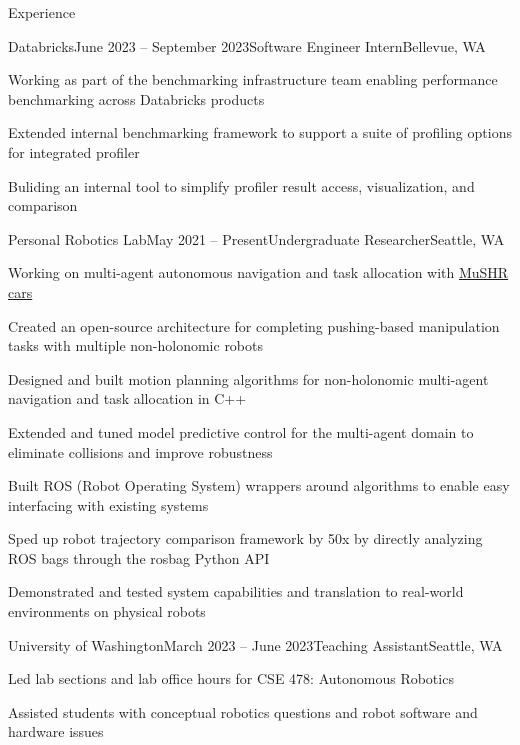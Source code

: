 \documentclass{resume} %
\begin{document}
\begin{rSection}{Experience}

\begin{rSubsection}{Databricks}{June 2023 – September 2023}{Software Engineer Intern}{Bellevue, WA}
\item Working as part of the benchmarking infrastructure team enabling performance benchmarking across Databricks products
\item Extended internal benchmarking framework to support a suite of profiling options for integrated profiler
\item Buliding an internal tool to simplify profiler result access, visualization, and comparison
\end{rSubsection}

\begin{rSubsection}{Personal Robotics Lab}{May 2021 – Present}{Undergraduate Researcher}{Seattle, WA}
\item Working on multi-agent autonomous navigation and task allocation with \href{https://mushr.io}{MuSHR cars}
\item Created an open-source architecture for completing pushing-based manipulation tasks with multiple non-holonomic robots
\item Designed and built motion planning algorithms for non-holonomic multi-agent navigation and task allocation in C++
\item Extended and tuned model predictive control for the multi-agent domain to eliminate collisions and improve robustness
\item Built ROS (Robot Operating System) wrappers around algorithms to enable easy interfacing with existing systems
\item Sped up robot trajectory comparison framework by 50x by directly analyzing ROS bags through the rosbag Python API
\item Demonstrated and tested system capabilities and translation to real-world environments on physical robots
\end{rSubsection}

\begin{rSubsection}{University of Washington}{March 2023 – June 2023}{Teaching Assistant}{Seattle, WA}
\item Led lab sections and lab office hours for CSE 478: Autonomous Robotics
\item Assisted students with conceptual robotics questions and robot software and hardware issues
\end{rSubsection}


\end{rSection}
\end{document}
